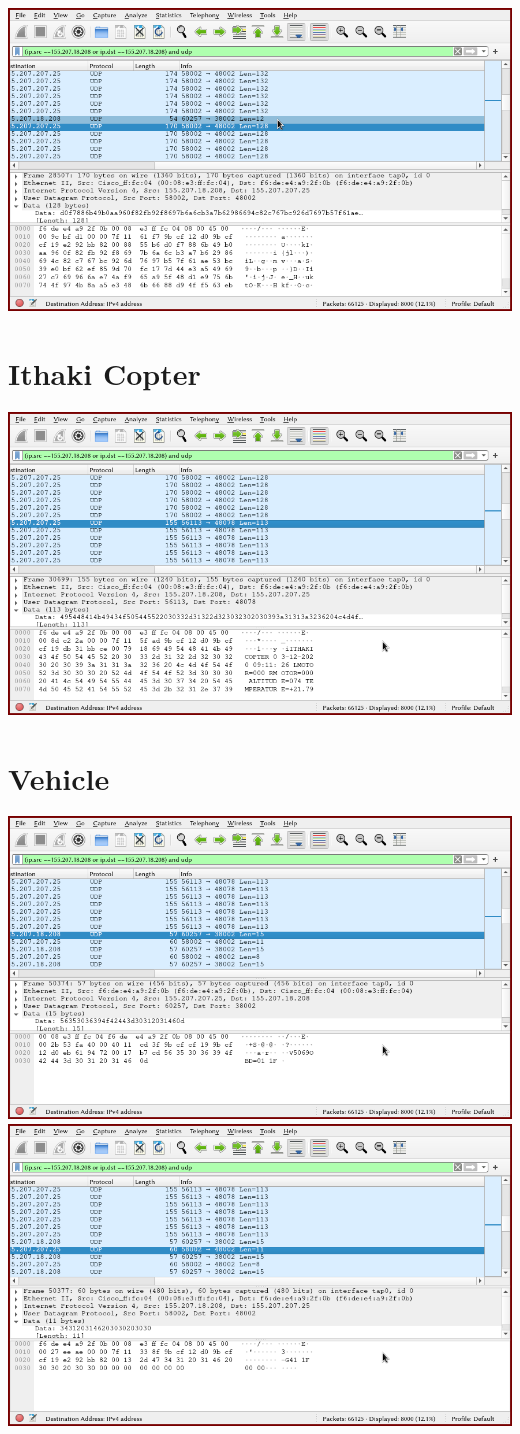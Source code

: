 \documentclass{article}
\begin{document}
\includegraphics[width=\textwidth]{wireshark12.png}

\section{Ithaki Copter}
\includegraphics[width=\textwidth]{wireshark13.png}

\section{Vehicle}
\includegraphics[width=\textwidth]{wireshark14.png}
\includegraphics[width=\textwidth]{wireshark15.png}
\end{document}
